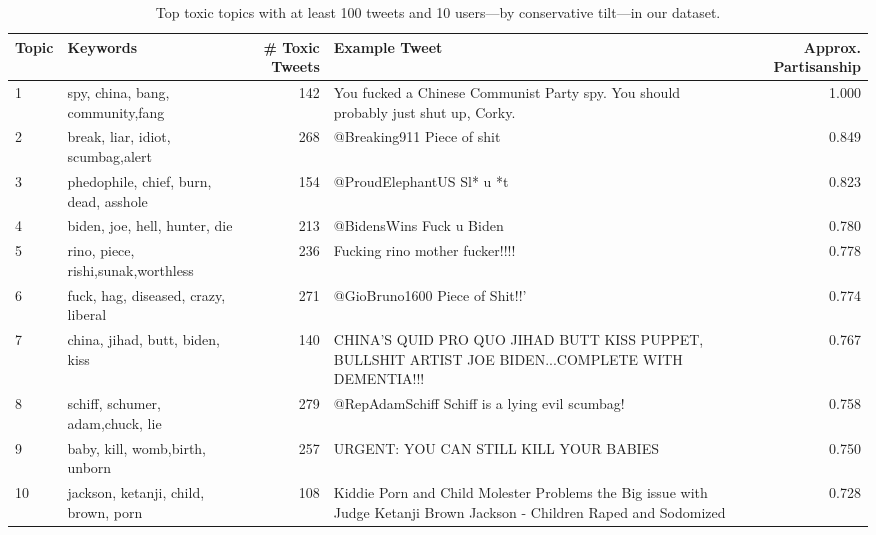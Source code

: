 \begin{table}
\centering
\scriptsize
\selectfont
\setlength{\tabcolsep}{4pt}
\begin{tabularx}{\textwidth}{l|lrXr}
\toprule
Topic &  {Keywords} & \# Toxic Tweets & Example Tweet  & Approx. Partisanship\\ \midrule
 1& spy, china, bang, community,fang & 142 &You fucked a Chinese Communist Party spy.  You should probably just shut up, Corky.  & 1.000 \\
2 & break, liar, idiot, scumbag,alert &268 &   @Breaking911 Piece of shit & 0.849 \\
3  & phedophile, chief, burn, dead, asshole &154 &  @ProudElephantUS Sl* u *t & 0.823 \\

4  & biden, joe, hell, hunter, die &213 & @BidensWins Fuck u Biden & 0.780\\
5 & rino, piece, rishi,sunak,worthless &236 & Fucking rino mother fucker!!!! & 0.778 \\
6  & fuck, hag, diseased, crazy, liberal &271  &@GioBruno1600 Piece of Shit!!' & 0.774 \\

7 & china, jihad, butt, biden, kiss & 140 & CHINA'S QUID PRO QUO JIHAD BUTT KISS PUPPET, BULLSHIT ARTIST JOE BIDEN...COMPLETE WITH DEMENTIA!!!& 0.767 \\

8  & schiff, schumer, adam,chuck, lie & 279 & @RepAdamSchiff Schiff is a lying evil scumbag!  & 0.758 \\
9  & baby, kill, womb,birth, unborn & 257 & URGENT: YOU CAN STILL KILL YOUR BABIES  & 0.750 \\
10  & jackson, ketanji, child, brown, porn & 108 & Kiddie Porn and Child Molester Problems the Big issue with Judge Ketanji Brown Jackson - Children Raped and Sodomized & 0.728 \\
\bottomrule
\end{tabularx}
\caption{\label{tab:narratives} Top toxic topics  with at least 100 tweets and 10 users---by conservative tilt---in our dataset.} %
\end{table}


